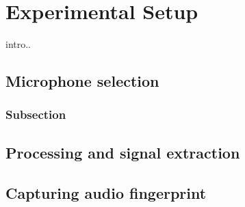 \chapter{Experimental Setup}
\label{chp:experimental_setup} 

intro..

\section{Microphone selection}\label{sec:microphone_selection}

\subsection{Subsection}\label{sec:first_ssection}


\section{Processing and signal extraction}\label{sec:processing_signal_extraction}


\section{Capturing audio fingerprint}\label{sec:capturing_audio_fingerprint}
